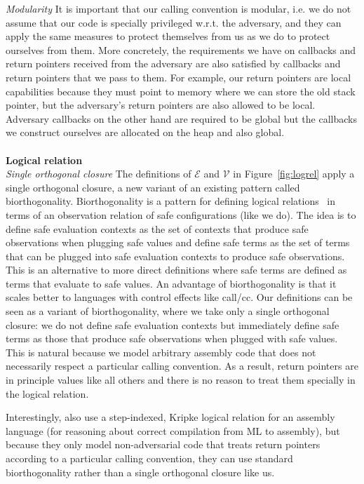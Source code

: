 \documentclass[compsoc,conference,letterpaper,fleqn]{IEEEtran}
\newcommand{\asmType}{\plaindom{AsmType}}
\newcommand{\plaindom}[1]{\mathrm{#1}}
\newcommand{\intr}[2]{\mathcal{#1}}
\newcommand{\valueintr}[1]{\intr{V}{#1}}
\newcommand{\exprintr}[1]{\intr{E}{#1}}
\newcommand{\stdvr}{\valueintr{\asmType}}
\newcommand{\stder}{\exprintr{\asmType}}
\begin{document}
\emph{Modularity} It is important that our calling convention is modular, i.e.
we do not assume that our code is specially privileged w.r.t. the adversary, and
they can apply the same measures to protect themselves from us as we do to
protect ourselves from them. More concretely, the requirements we have on
callbacks and return pointers received from the adversary are also satisfied by
callbacks and return pointers that we pass to them. For example, our return
pointers are local capabilities because they must point to memory where we can
store the old stack pointer, but the adversary's return pointers are also
allowed to be local. Adversary callbacks on the other hand are required to
be global but the callbacks we construct ourselves are allocated on the heap and
also global. \\\\
\noindent\textbf{Logical relation}\\
\emph{Single orthogonal closure} The definitions of $\stder$ and $\stdvr$ in
Figure~\ref{fig:logrel} apply a single orthogonal closure, a new variant of an
existing pattern called biorthogonality. Biorthogonality is a pattern for
defining logical relations~\citep{krivine_classical_1994,pitts_operational_1998}
in terms of an observation relation of safe configurations (like we do). The
idea is to define safe evaluation contexts as the set of contexts that produce
safe observations when plugging safe values and define safe terms as the set of
terms that can be plugged into safe evaluation contexts to produce safe
observations. This is an alternative to more direct definitions where safe terms
are defined as terms that evaluate to safe values. An advantage of
biorthogonality is that it scales better to languages with control effects like
call/cc. Our definitions can be seen as a variant of biorthogonality, where we
take only a single orthogonal closure: we do not define safe evaluation contexts
but immediately define safe terms as those that produce safe observations when
plugged with safe values. This is natural because we model arbitrary assembly
code that does not necessarily respect a particular calling convention. As a
result, return pointers are in principle values like all others and there is no
reason to treat them specially in the logical relation.

Interestingly, \citet{Hur:2011:KLR:1926385.1926402} also use a step-indexed,
Kripke logical relation for an assembly language (for reasoning about correct
compilation from ML to assembly), but because they only model non-adversarial
code that treats return pointers according to a particular calling convention,
they can use standard biorthogonality rather than a single orthogonal closure
like us.
\end{document}
